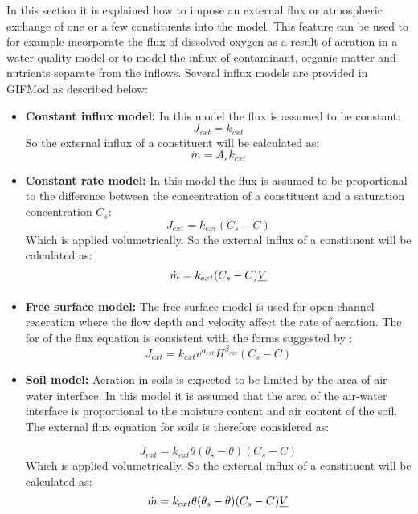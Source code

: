 In this section it is explained how to impose an external flux or atmospheric exchange of one or a few constituents into the model. This feature can be used to for example incorporate the flux of dissolved oxygen as a result of aeration in a water quality model or to model the influx of contaminant, organic matter and nutrients separate from the inflows. Several influx models are provided in GIFMod as described below: 
\begin{itemize}
\item \textbf{Constant influx model: } In this model the flux is assumed to be constant: 
\begin{equation}
\label{eq:28}
J_{ext} = k_{ext}
\end{equation}
So the external influx of a constituent will be calculated as: 
\begin{equation}
\label{eq:29}
\dot{m} = A_s k_{ext}
\end{equation}

\item \textbf{Constant rate model: } In this model the flux is assumed to be proportional to the difference between the concentration of a constituent and a saturation concentration $C_s$: 
\begin{equation}
\label{eq:30}
J_{ext} = k_{ext}(C_s-C)
\end{equation}
Which is applied volumetrically. So the external influx of a constituent will be calculated as: 
 \begin{equation}
\label{eq:30a}
\dot{m} = k_{ext}(C_s-C) \sout{V}
\end{equation}

\item \textbf{Free surface model: } The free surface model is used for open-channel reaeration where the flow depth and velocity affect the rate of aeration. The for of the flux equation is consistent with the forms suggested by \citep{oconnor1956,churchill1964,owens1964some,isaacs1968,langbein1967}:
\begin{equation}
\label{eq:31}
J_{ext} = k_{ext}v^{\alpha_{ext}}H^{\beta_{ext}}(C_s-C)
\end{equation}


\item \textbf{Soil model: } Aeration in soils is expected to be limited by the area of air-water interface. In this model it is assumed that the area of the air-water interface is proportional to the moisture content and air content of the soil. The external flux equation for soils is therefore considered as: 

\begin{equation}
\label{eq:32}
J_{ext} = k_{ext}\theta (\theta_s-\theta) (C_s-C)
\end{equation}
Which is applied volumetrically. So the external influx of a constituent will be calculated as: 
 \begin{equation}
\label{eq:33}
\dot{m} = k_{ext}\theta (\theta_s-\theta) (C_s-C) \sout{V}
\end{equation}
\end{itemize}
